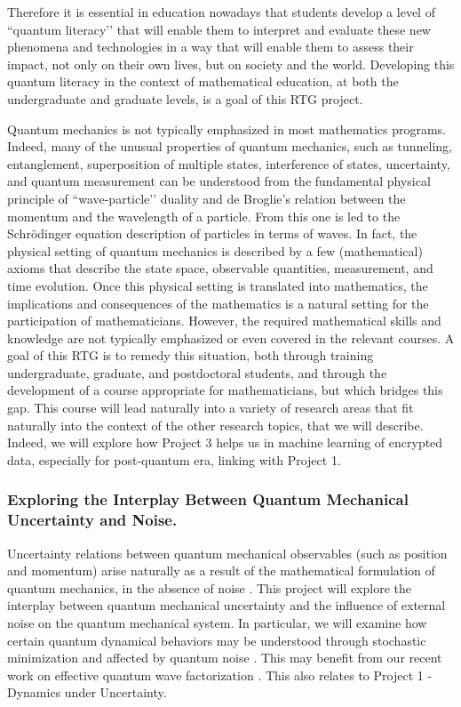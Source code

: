 \documentclass[11pt]{NSFamsart}
\begin{document}
Therefore it is essential in education nowadays that students develop a level of ``quantum literacy’’ \cite{foti2021quantum} that will enable them to interpret and evaluate these new phenomena and technologies in a way that will enable them to assess their impact, not only on their own  lives, but on society and the world. Developing this quantum literacy in the context of mathematical education,    at both the undergraduate and graduate   levels,  is a goal of this RTG project.


Quantum mechanics is not typically emphasized in most mathematics programs.  Indeed, many of the unusual properties of quantum mechanics, such as tunneling, entanglement, superposition of multiple states, interference of states, uncertainty, and quantum measurement can be understood from the fundamental physical principle of ``wave-particle’’ duality and de Broglie’s relation between the momentum and the wavelength of a particle.  From this one is led to the Schr\"{o}dinger equation description of particles in terms of waves. In fact, the physical setting of quantum mechanics is described by a few (mathematical) axioms that describe the state space, observable quantities, measurement, and time evolution.  Once this physical setting is translated into mathematics, the implications and consequences of the mathematics is a natural setting for the participation of mathematicians. However, the required mathematical skills and knowledge are not typically emphasized or even covered in the relevant courses. A goal of this RTG is to remedy this situation, both through training undergraduate, graduate, and postdoctoral students, and through the development of a course appropriate for mathematicians, but which bridges this gap. This course will lead naturally into a variety of research areas that fit naturally into the context of the other research topics, that we will describe. Indeed, we will explore how   Project 3 helps us in machine learning of encrypted data, especially for post-quantum era, linking with Project 1.  

\subsubsection*{Exploring the Interplay Between Quantum Mechanical Uncertainty and Noise.} Uncertainty relations between quantum mechanical observables (such as position and momentum) arise naturally as a result of the mathematical formulation of quantum mechanics, in the absence of noise \cite{Griffiths2018IntroductionTQ}. This project will explore the interplay between quantum mechanical uncertainty and the influence of external noise \cite{Lindgren2019QuantumMC, Nagasawa2000StochasticPI} on the quantum mechanical system. In particular, we will examine how certain quantum dynamical behaviors  may be understood through stochastic minimization \cite{Lindgren2019QuantumMC} and affected by quantum noise \cite{Nurdin2019QuantumSP}. This may   benefit from our recent work on effective quantum wave factorization \cite{ZHANG2020132573}. This also relates to   Project 1 - Dynamics under Uncertainty.
\end{document}
